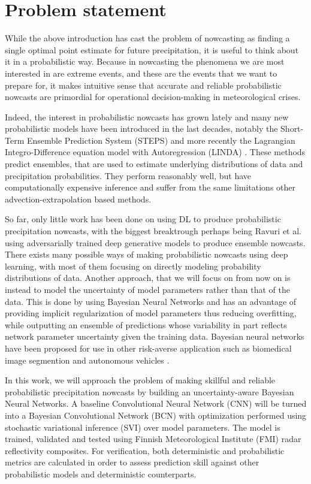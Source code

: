 \section{Problem statement}


While the above introduction has cast the problem of nowcasting as finding a single optimal point estimate for future precipitation, it is useful to think about it in a probabilistic way. Because in nowcasting the phenomena we are most interested in are extreme events, and these are the events that we want to prepare for, it makes intuitive sense that accurate and reliable probabilistic nowcasts are primordial for operational decision-making in meteorological crises.

Indeed, the interest in probabilistic nowcasts has grown lately and many new probabilistic models have been introduced in the last decades, notably the Short-Term Ensemble Prediction System (STEPS) \cite{bowler_steps_2006} and more recently the Lagrangian Integro-Difference equation model with Autoregression (LINDA) \cite{pulkkinen_lagrangian_2021}. These methods predict ensembles, that are used to estimate underlying distributions of data and precipitation probabilities. They perform reasonably well, but have computationally expensive inference and suffer from the same limitations other advection-extrapolation based methods. 

So far, only little work has been done on using DL to produce probabilistic precipitation nowcasts, with the biggest breaktrough perhaps being Ravuri et al. \cite{ravuri_skilful_2021} using adversarially trained deep generative models to produce ensemble nowcasts. There exists many possible ways of making probabilistic nowcasts using deep learning, with most of them focusing on directly modeling probability distributions of data. Another approach, that we will focus on from now on is instead to model the uncertainty of model parameters rather than that of the data. This is done by using Bayesian Neural Networks and has an advantage of providing implicit regularization of model parameters thus reducing overfitting, while outputting an ensemble of predictions whose variability in part reflects network parameter uncertainty given the training data. Bayesian neural networks have been proposed for use in other risk-averse application such as biomedical image segmention \cite{kwon_uncertainty_2020} and autonomous vehicles \cite{mcallister_concrete_2017}. 

In this work, we will approach the problem of making skillful and reliable probabilistic precipitation nowcasts by building an uncertainty-aware Bayesian Neural Networks. A baseline Convolutional Neural Network (CNN) will be turned into a Bayesian Convolutional Network (BCN) with optimization performed using stochastic variational inference (SVI) over model parameters. The model is trained, validated and tested using Finnish Meteorological Institute (FMI) radar reflectivity composites. For verification, both deterministic and probabilistic metrics are calculated in order to assess prediction skill against other probabilistic models and deterministic counterparts. 


